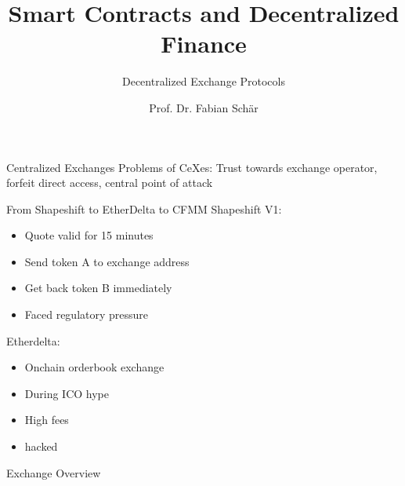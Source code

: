 \documentclass[]{beamer}
\title{Smart Contracts and Decentralized Finance}
\subtitle{Decentralized Exchange Protocols}
\author{Prof. Dr. Fabian Schär}
\institute{University of Basel}
\begin{document}
\thispagestyle{empty}
\begin{frame}[noframenumbering]
	\titlepage
\end{frame}

\begin{frame}{Centralized Exchanges}
	Problems of CeXes: Trust towards exchange operator, forfeit direct access, central point of attack
\end{frame}

\begin{frame}{From Shapeshift to EtherDelta to CFMM}
Shapeshift V1:
\begin{itemize}
	\item Quote valid for 15 minutes
	\item Send token A to exchange address
	\item Get back token B immediately
	\item Faced regulatory pressure
\end{itemize}

Etherdelta:
\begin{itemize}
	\item Onchain orderbook exchange
	\item During ICO hype
	\item High fees
	\item hacked
\end{itemize}
\end{frame}

\begin{frame}{Exchange Overview}

	\begin{figure}[h!]
		
	\end{figure}
	

\end{frame}
\end{document}
